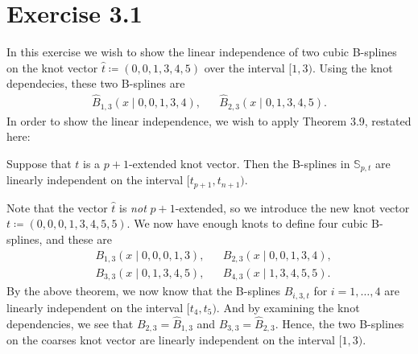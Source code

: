 \documentclass{article}
\author{Ivar Haugal{\o}kken Stangeby}
\renewcommand{\S}{\mathbb{S}}
\begin{document}
    \maketitle 

    \section*{Exercise 3.1}
    
    In this exercise we wish to show the linear independence of two cubic
    B-splines on the knot vector $\hat{t} \coloneqq (0, 0, 1, 3, 4, 5)$ over
    the interval $[1, 3)$. Using the knot dependecies, these two B-splines are
    \begin{align*}
        \hat{B}_{1, 3}(x \mid 0, 0, 1, 3, 4), && \hat{B}_{2, 3}(x \mid 0, 1, 3,
        4, 5).
    \end{align*}
    In order to show the linear independence, we wish to apply Theorem 3.9,
    restated here:

    \begin{theorem}
        Suppose that $t$ is a $p + 1$-extended knot vector. Then the B-splines
        in $\S_{p, t}$ are linearly independent on the interval $[t_{p+1},
        t_{n+1})$.
    \end{theorem}
    
    Note that the vector $\hat{t}$ is \emph{not} $p+1$-extended, so we
    introduce the new knot vector $t \coloneqq (0, 0, 0, 1, 3, 4, 5, 5)$.  We
    now have enough knots to define four cubic B-splines, and these are
    \begin{align*}
        &B_{1, 3}(x \mid 0, 0, 0, 1, 3), & &B_{2, 3}(x \mid 0, 0, 1, 3, 4), \\
        &B_{3, 3}(x \mid 0, 1, 3, 4, 5), & &B_{4, 3}(x \mid 1, 3, 4, 5, 5).
    \end{align*}
    By the above theorem, we now know that the B-splines $B_{i, 3, t}$ for $i =
    1, \ldots, 4$ are linearly independent on the interval $[t_{4}, t_{5})$.
    And by examining the knot dependencies, we see that $B_{2, 3} = \hat{B}_{1,
    3}$ and $B_{3, 3} = \hat{B}_{2, 3}$. Hence, the two B-splines on the
    coarses knot vector are linearly independent on the interval $[1, 3)$.
\end{document}

